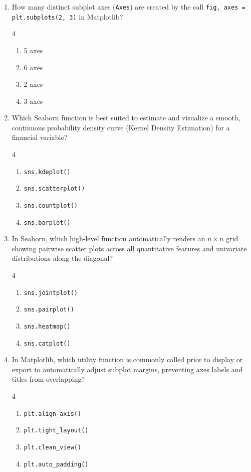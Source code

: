 \documentclass[11pt,a4paper]{article}
\begin{document}
\begin{enumerate}[leftmargin=*,itemsep=2.5pt,resume]
\item How many distinct subplot axes (\texttt{Axes}) are created by the call \texttt{fig, axes = plt.subplots(2, 3)} in Matplotlib?
\begin{multicols}{4}
\begin{enumerate}[label=\Alph*.]
  \item 5 axes
  \item 6 axes
  \item 2 axes
  \item 3 axes
\end{enumerate}
\end{multicols}

\item Which Seaborn function is best suited to estimate and visualize a smooth, continuous probability density curve (Kernel Density Estimation) for a financial variable?
\begin{multicols}{4}
\begin{enumerate}[label=\Alph*.]
  \item \texttt{sns.kdeplot()}
  \item \texttt{sns.scatterplot()}
  \item \texttt{sns.countplot()}
  \item \texttt{sns.barplot()}
\end{enumerate}
\end{multicols}

\item In Seaborn, which high-level function automatically renders an $n \times n$ grid showing pairwise scatter plots across all quantitative features and univariate distributions along the diagonal?
\begin{multicols}{4}
\begin{enumerate}[label=\Alph*.]
  \item \texttt{sns.jointplot()}
  \item \texttt{sns.pairplot()}
  \item \texttt{sns.heatmap()}
  \item \texttt{sns.catplot()}
\end{enumerate}
\end{multicols}

\item In Matplotlib, which utility function is commonly called prior to display or export to automatically adjust subplot margins, preventing axes labels and titles from overlapping?
\begin{multicols}{4}
\begin{enumerate}[label=\Alph*.]
  \item \texttt{plt.align\_axis()}
  \item \texttt{plt.tight\_layout()}
  \item \texttt{plt.clean\_view()}
  \item \texttt{plt.auto\_padding()}
\end{enumerate}
\end{multicols}


\end{enumerate}
\end{document}
